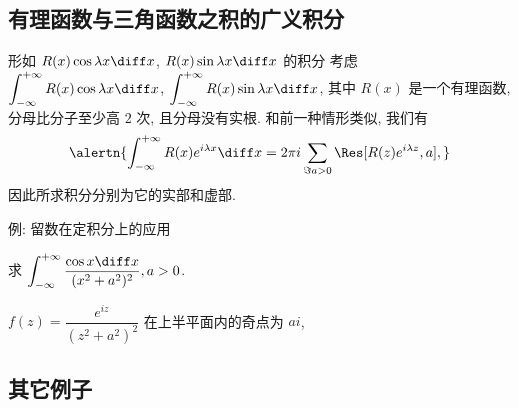 \subsection{有理函数与三角函数之积的广义积分}

\begin{frame}{形如 $R(x)\cos{\lambda x}\diff x$,
	$R(x)\sin{\lambda x}\diff x$ 的积分\noexer}
	\onslide<+->
	考虑 $\displaystyle\int_{-\infty}^{+\infty}R(x)\cos{\lambda x}\diff x$,
	$\displaystyle\int_{-\infty}^{+\infty}R(x)\sin{\lambda x}\diff x$, 其中 $R(x)$ 是一个有理函数, 分母比分子至少高 $2$ 次, 且分母没有实根.
	\onslide<+->
	和前一种情形类似, 我们有
	\[\alertn{\int_{-\infty}^{+\infty}R(x)e^{i\lambda x}\diff x
	=2\pi i\sum_{\Im a>0}\Res[R(z)e^{i\lambda z},a],}\]
	\onslide<+->
	因此所求积分分别为它的实部和虚部.
\end{frame}


\begin{frame}{例: 留数在定积分上的应用\noexer}
	\beqskip{2pt}
	\onslide<+->
	\begin{example}
		求 $\displaystyle\int_{-\infty}^{+\infty}\frac{\cos x\diff x}{(x^2+a^2)^2}, a>0$.
	\end{example}

	\onslide<+->
	\begin{solution}
		$f(z)=\dfrac{e^{iz}}{(z^2+a^2)^2}$ 在上半平面内的奇点为 $ai$,
		\onslide<+->{
			\[\Res[f(z),ai]=\lim_{z\to ai}\left[\frac{e^{iz}}{(z+ai)^2}\right]'=-\frac{e^{-a}(a+1)i}{4a^3}.\]
		}\onslide<+->{
			\[\int_{-\infty}^{+\infty}\frac{\cos x\diff x}{(x^2+a^2)^2}=\frac{\pi e^{-a}(a+1)}{2a^3}.\]
		}
	\end{solution}
	\endgroup
\end{frame}


\subsection{其它例子}


